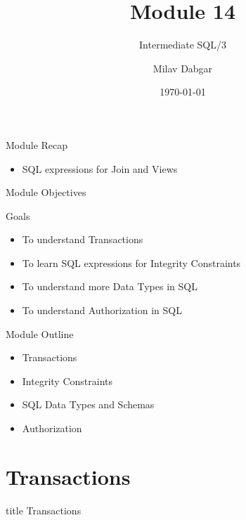 \documentclass[aspectratio=169, xcolor=dvipsnames]{beamer}
\title{Module 14}
\subtitle{Intermediate SQL/3}
\author{Milav Dabgar}
\institute{www.milav.in}
\date{\today}
\begin{document}
\begin{frame}
    \titlepage
\end{frame}

\begin{frame}{Module Recap}
    \begin{itemize}[<+->]
        \item SQL expressions for Join and Views
    \end{itemize}
\end{frame}

\begin{frame}{Module Objectives}
    \begin{block}{Goals}
        \begin{itemize}[<+->]
            \item To understand Transactions
            \item To learn SQL expressions for Integrity Constraints
            \item To understand more Data Types in SQL
            \item To understand Authorization in SQL
        \end{itemize}
    \end{block}
\end{frame}

\begin{frame}{Module Outline}
    \begin{itemize}[<+->]
        \item Transactions
        \item Integrity Constraints
        \item SQL Data Types and Schemas
        \item Authorization
    \end{itemize}
\end{frame}

\section{Transactions}

\begin{frame}
  \vfill
  \centering
  \begin{beamercolorbox}[sep=8pt,center,shadow=true,rounded=true]{title}
    Transactions\par%
  \end{beamercolorbox}
  \vfill
\end{frame}
\end{document}
